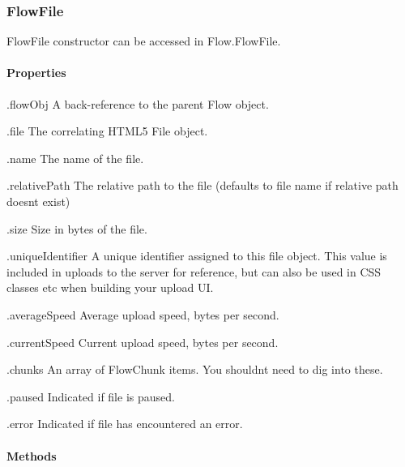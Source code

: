 \subsubsection*{Flow\+File}

Flow\+File constructor can be accessed in {\ttfamily Flow.\+Flow\+File}. \paragraph*{Properties}


\begin{DoxyItemize}
\item {\ttfamily .flow\+Obj} A back-\/reference to the parent {\ttfamily Flow} object.
\item {\ttfamily .file} The correlating H\+T\+M\+L5 {\ttfamily File} object.
\item {\ttfamily .name} The name of the file.
\item {\ttfamily .relative\+Path} The relative path to the file (defaults to file name if relative path doesn\textquotesingle{}t exist)
\item {\ttfamily .size} Size in bytes of the file.
\item {\ttfamily .unique\+Identifier} A unique identifier assigned to this file object. This value is included in uploads to the server for reference, but can also be used in C\+SS classes etc when building your upload UI.
\item {\ttfamily .average\+Speed} Average upload speed, bytes per second.
\item {\ttfamily .current\+Speed} Current upload speed, bytes per second.
\item {\ttfamily .chunks} An array of {\ttfamily Flow\+Chunk} items. You shouldn\textquotesingle{}t need to dig into these.
\item {\ttfamily .paused} Indicated if file is paused.
\item {\ttfamily .error} Indicated if file has encountered an error.
\end{DoxyItemize}

\paragraph*{Methods}


